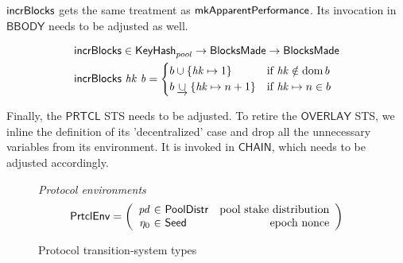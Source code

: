 $\mathsf{incrBlocks}$ gets the same treatment as $\mathsf{mkApparentPerformance}$. Its invocation in $\mathsf{BBODY}$ needs to be adjusted as well.

\begin{figure}
  \begin{align*}
      & \mathsf{incrBlocks} \in \mathsf{KeyHash}_{pool} \to
          \mathsf{BlocksMade} \to \mathsf{BlocksMade} \\
      & \mathsf{incrBlocks}~\mathit{hk}~\mathit{b} =
        \begin{cases}
          b\cup\{\mathit{hk}\mapsto 1\} & \text{if }\mathit{hk}\notin\operatorname{dom}{b} \\
          b\mathbin{\underrightarrow\cup}\{\mathit{hk}\mapsto n+1\} & \text{if }\mathit{hk}\mapsto n\in b \\
        \end{cases}
  \end{align*}
\end{figure}

\newpage
Finally, the $\mathsf{PRTCL}$ STS needs to be adjusted. To retire the $\mathsf{OVERLAY}$ STS, we inline the definition of its 'decentralized' case and drop all the unnecessary variables from its environment. It is invoked in $\mathsf{CHAIN}$, which needs to be adjusted accordingly.

\begin{figure}
  \emph{Protocol environments}
  \begin{equation*}
    \PrtclEnv =
    \left(
      \begin{array}{r@{~\in~}lr}
        \var{pd} & \PoolDistr & \text{pool stake distribution} \\
        \eta_0 & \Seed & \text{epoch nonce} \\
      \end{array}
    \right)
  \end{equation*}
  \caption{Protocol transition-system types}
  \label{fig:ts-types:prtcl}
\end{figure}

